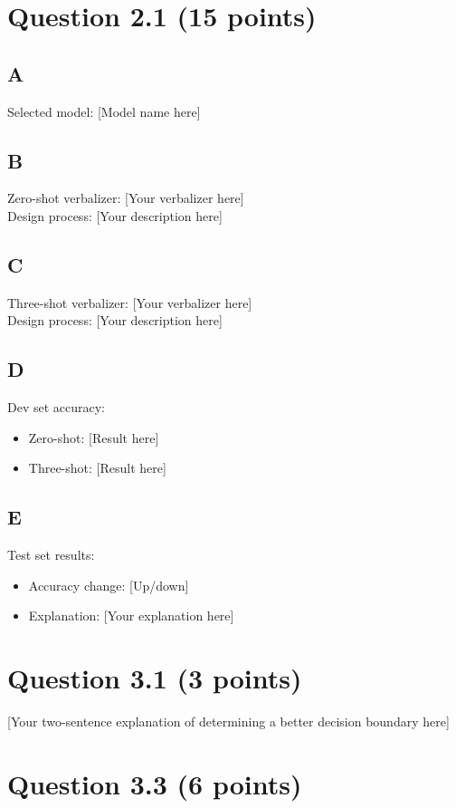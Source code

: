 \documentclass{article}
\begin{document}
\section*{Question 2.1 (15 points)}

\subsection*{A}
Selected model: [Model name here]

\subsection*{B}
Zero-shot verbalizer: [Your verbalizer here]
\\
Design process: [Your description here]

\subsection*{C}
Three-shot verbalizer: [Your verbalizer here]
\\
Design process: [Your description here]

\subsection*{D}
Dev set accuracy:
\begin{itemize}
    \item Zero-shot: [Result here]
    \item Three-shot: [Result here]
\end{itemize}

\subsection*{E}
Test set results:
\begin{itemize}
    \item Accuracy change: [Up/down]
    \item Explanation: [Your explanation here]
\end{itemize}

\section*{Question 3.1 (3 points)}
[Your two-sentence explanation of determining a better decision boundary here]

\section*{Question 3.3 (6 points)}
\end{document}
